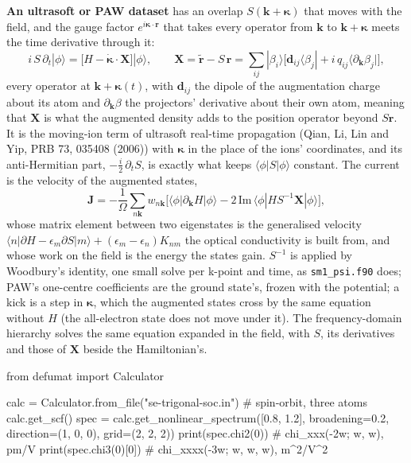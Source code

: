 \documentclass[11pt,a4paper]{article}
\newcommand{\code}[1]{\texttt{\small #1}}
\begin{document}
\textbf{An ultrasoft or PAW dataset} has an overlap $S(\mathbf k+\boldsymbol\kappa)$
that moves with the field, and the gauge factor $e^{i\boldsymbol\kappa\cdot\mathbf r}$
that takes every operator from $\mathbf k$ to $\mathbf k+\boldsymbol\kappa$ meets
the time derivative through it:
\begin{equation*}
i\,S\,\partial_t|\phi\rangle = \big[H - \dot{\boldsymbol\kappa}\cdot\mathbf X\big]|\phi\rangle,
\qquad
\mathbf X = \tilde{\mathbf r} - S\,\mathbf r
 = \sum_{ij}|\beta_i\rangle\big[\mathbf d_{ij}\langle\beta_j|
   + i\,q_{ij}\langle\partial_{\mathbf k}\beta_j|\big],
\end{equation*}
every operator at $\mathbf k+\boldsymbol\kappa(t)$, with $\mathbf d_{ij}$ the
dipole of the augmentation charge about its atom and $\partial_{\mathbf k}\beta$
the projectors' derivative about their own atom, meaning that $\mathbf X$ is what
the augmented density adds to the position operator beyond $S\mathbf r$. It is
the moving-ion term of ultrasoft real-time propagation (Qian, Li, Lin and Yip,
PRB 73, 035408 (2006)) with $\boldsymbol\kappa$ in the place of the ions'
coordinates, and its anti-Hermitian part, $-\tfrac i2\,\partial_t S$, is exactly
what keeps $\langle\phi|S|\phi\rangle$ constant. The current is the velocity of
the augmented states,
\begin{equation*}
\mathbf J = -\frac1\Omega\sum_{n\mathbf k} w_{n\mathbf k}\Big[
\langle\phi|\partial_{\mathbf k}H|\phi\rangle
- 2\,\mathrm{Im}\,\langle\phi|H S^{-1}\mathbf X|\phi\rangle\Big],
\end{equation*}
whose matrix element between two eigenstates is the generalised velocity
$\langle n|\partial H - \epsilon_m\partial S|m\rangle + (\epsilon_m-\epsilon_n)K_{nm}$
the optical conductivity is built from, and whose work on the field is the
energy the states gain. $S^{-1}$ is applied by Woodbury's identity, one small
solve per k-point and time, as \code{sm1\_psi.f90} does; PAW's one-centre
coefficients are the ground state's, frozen with the potential; a kick is a step
in $\boldsymbol\kappa$, which the augmented states cross by the same equation
without $H$ (the all-electron state does not move under it). The frequency-domain
hierarchy solves the same equation expanded in the field, with $S$, its
derivatives and those of $\mathbf X$ beside the Hamiltonian's.

\begin{pycode}
from defumat import Calculator

calc = Calculator.from_file("se-trigonal-soc.in")   # spin-orbit, three atoms
calc.get_scf()
spec = calc.get_nonlinear_spectrum([0.8, 1.2], broadening=0.2,
                                   direction=(1, 0, 0), grid=(2, 2, 2))
print(spec.chi2(0))       # chi_xxx(-2w; w, w), pm/V
print(spec.chi3(0)[0])    # chi_xxxx(-3w; w, w, w), m^2/V^2
\end{pycode}
\end{document}
